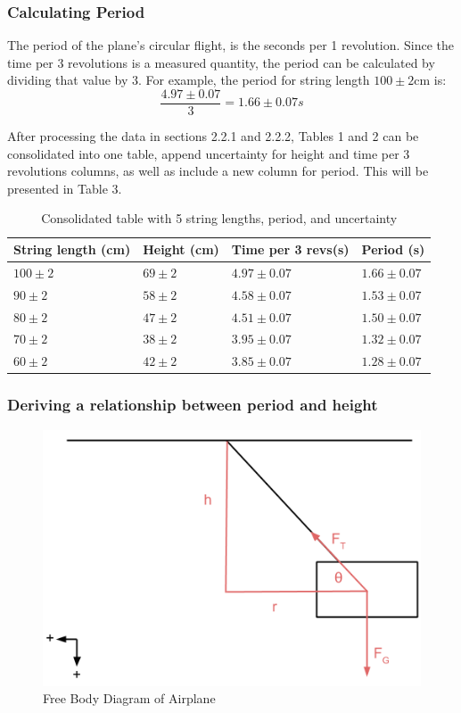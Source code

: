 \documentclass[10pt, letterpaper]{article}
\begin{document}
\subsubsection{Calculating Period}
The period of the plane's circular flight, is the seconds per 1 revolution. Since the time per 3 revolutions is a measured quantity,
the period can be calculated by dividing that value by 3. For example, the period for string length $100 \pm 2$cm is:
\[ \frac{4.97 \pm 0.07}{3} = 1.66 \pm 0.07s \]

After processing the data in sections 2.2.1 and 2.2.2, Tables 1 and 2 can be consolidated into one table, append
uncertainty for height and time per 3 revolutions columns, as well as include a new column for period. This will be presented in Table 3.

\begin{table}[H]
\begin{tabularx}{\linewidth}{>{\centering\arraybackslash}X>{\centering\arraybackslash}X>{\centering\arraybackslash}X>{\centering\arraybackslash}X }
\hline \textbf{String length (cm)} & \textbf{Height (cm)} & \textbf{Time per 3 revs(s)} & \textbf{Period (s)} \\ \hline
$100 \pm 2$ & $69 \pm 2$ & $4.97 \pm 0.07$ & $1.66 \pm 0.07$ \\ \hline
$90 \pm 2$ & $58 \pm 2$ & $4.58 \pm 0.07$ & $1.53 \pm 0.07$ \\ \hline
$80 \pm 2$ & $47 \pm 2$ & $4.51 \pm 0.07$ & $1.50 \pm 0.07$ \\ \hline
$70 \pm 2$ & $38 \pm 2$ & $3.95 \pm 0.07$ & $1.32 \pm 0.07$ \\ \hline
$60 \pm 2$ & $42 \pm 2$ & $3.85 \pm 0.07$ & $1.28 \pm 0.07$ \\ \hline
\end{tabularx}
\caption{Consolidated table with 5 string lengths, period, and uncertainty}
\end{table}

\subsubsection{Deriving a relationship between period and height}

\begin{figure}[!htb]
\centering
\includegraphics[scale=0.5]{Lab1_FreeBody.png}
\caption{Free Body Diagram of Airplane}
\end{figure}
\end{document}
